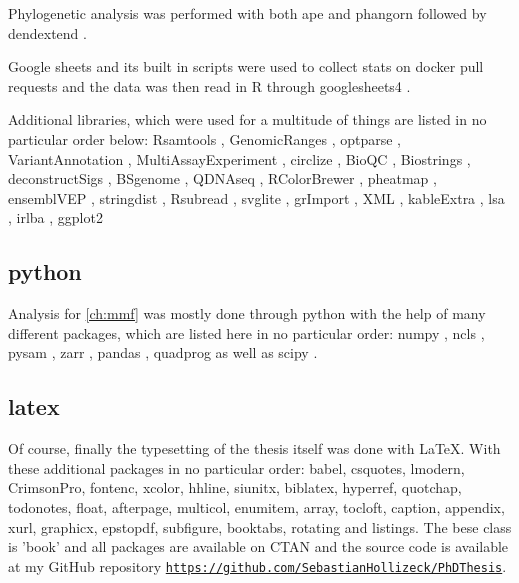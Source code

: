 {Phylogenetic analysis was performed with both ape \cite{Paradis2018} and phangorn \cite{Schliep2017} followed by dendextend \cite{Galili2015}.

Google sheets and its built in scripts were used to collect stats on docker pull requests and the data was then read in R through googlesheets4 \cite{Bryan2021}.

Additional libraries, which were used for a multitude of things are listed in no particular order below: Rsamtools \cite{Morgan2021}, GenomicRanges \cite{Lawrence2013}, optparse \cite{Davis2020}, VariantAnnotation \cite{Obenchain2014}, MultiAssayExperiment \cite{Ramos2017}, circlize \cite{Gu2014}, BioQC \cite{Zhang2017}, Biostrings \cite{Pages2020}, deconstructSigs \cite{Rosenthal2016}, BSgenome \cite{Pages2020a}, QDNAseq \cite{Scheinin2014}, RColorBrewer \cite{Neuwirth2014}, pheatmap \cite{Kolde2019}, ensemblVEP \cite{Obenchain2020}, stringdist \cite{vanderLoo2014}, Rsubread \cite{Liao2019}, svglite \cite{Wickham2021}, grImport \cite{Murrell2009}, XML \cite{TempleLang2020}, kableExtra \cite{Zhu2021}, lsa \cite{Wild2020}, irlba \cite{Baglama2019}, ggplot2 \cite{Wickham2016}


\subsection{python}
Analysis for \autoref{ch:mmf} was mostly done through python \cite{VanRossum2010} with the help of many different packages, which are listed here in no particular order: numpy \cite{Harris2020}, ncls \cite{Stovner2019}, pysam \cite{Heger2021,Bonfield2021,Danecek2021}, zarr \cite{Miles2021}, pandas \cite{McKinney2010,Reback2021}, quadprog \cite{McGibbon2021} as well as scipy \cite{Virtanen2020}.

\subsection{latex}
Of course, finally the typesetting of the thesis itself was done with \LaTeX. With these additional packages in no particular order: babel, csquotes, lmodern, CrimsonPro, fontenc, xcolor, hhline, siunitx, biblatex, hyperref, quotchap, todonotes, float, afterpage, multicol, enumitem, array, tocloft, caption, appendix, xurl, graphicx, epstopdf, subfigure, booktabs, rotating and listings. 
The bese class is 'book' and all packages are available on CTAN and the source code is available at my GitHub repository \href{https://github.com/SebastianHollizeck/PhDThesis}{\nolinkurl{https://github.com/SebastianHollizeck/PhDThesis}}.

}

